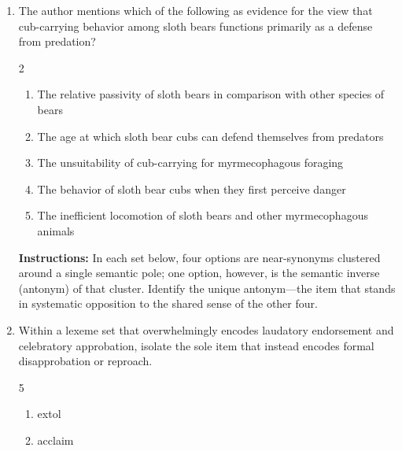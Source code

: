 \documentclass[12pt]{article}
\begin{document}
\begin{enumerate}[label=\textbf{\arabic*.}]
\begin{multicols}{2}
\begin{enumerate}[label=(\Alph*)]
\end{enumerate}

\end{multicols}

\item The author mentions which of the following as evidence for the view that cub-carrying behavior among sloth bears functions primarily as a defense from predation?

\begin{multicols}{2}

\begin{enumerate}[label=(\Alph*)]

\item The relative passivity of sloth bears in comparison with other species of bears

\item The age at which sloth bear cubs can defend themselves from predators

\item The unsuitability of cub-carrying for myrmecophagous foraging

\item The behavior of sloth bear cubs when they first perceive danger

\item The inefficient locomotion of sloth bears and other myrmecophagous animals

\end{enumerate}

\end{multicols}

\noindent\textbf{Instructions:} In each set below, four options are near-synonyms clustered around a single semantic pole; one option, however, is the semantic inverse (antonym) of that cluster. Identify the unique antonym—the item that stands in systematic opposition to the shared sense of the other four.

\item Within a lexeme set that overwhelmingly encodes laudatory endorsement and celebratory approbation, isolate the sole item that instead encodes formal disapprobation or reproach.

\begin{multicols}{5}

\begin{enumerate}[label=(\Alph*)]

\item extol

\item acclaim


\end{enumerate}
\end{multicols}
\end{enumerate}
\end{document}
